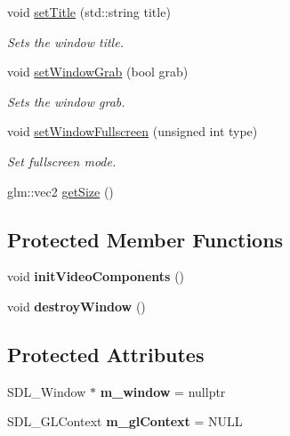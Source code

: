 \begin{DoxyCompactItemize}
void \hyperlink{classce_1_1core_1_1_window_ac182b4657e4240663b49923e6349e48c}{set\+Title} (std\+::string title)
\begin{DoxyCompactList}\small\item\em Sets the window title. \end{DoxyCompactList}\item 
void \hyperlink{classce_1_1core_1_1_window_a40a91b63d87c6942dea3186fb4b05085}{set\+Window\+Grab} (bool grab)
\begin{DoxyCompactList}\small\item\em Sets the window grab. \end{DoxyCompactList}\item 
void \hyperlink{classce_1_1core_1_1_window_a9fafce9f3898b399c149a561d9ceac12}{set\+Window\+Fullscreen} (unsigned int type)
\begin{DoxyCompactList}\small\item\em Set fullscreen mode. \end{DoxyCompactList}\item 
glm\+::vec2 \hyperlink{classce_1_1core_1_1_window_abba818ed742e942c7d009c1c1fd7ecca}{get\+Size} ()
\end{DoxyCompactItemize}
\subsection*{Protected Member Functions}
\begin{DoxyCompactItemize}
\item 
\mbox{\label{classce_1_1core_1_1_window_a03535243d5663e6f7432f2cba0888642}} 
void {\bfseries init\+Video\+Components} ()
\item 
\mbox{\label{classce_1_1core_1_1_window_aa29eebc80fdc4556365bc4c42e953a12}} 
void {\bfseries destroy\+Window} ()
\end{DoxyCompactItemize}
\subsection*{Protected Attributes}
\begin{DoxyCompactItemize}
\item 
\mbox{\label{classce_1_1core_1_1_window_a84ff05cd18af48c99b59f661544f0a5c}} 
S\+D\+L\+\_\+\+Window $\ast$ {\bfseries m\+\_\+window} = nullptr
\item 
\mbox{\label{classce_1_1core_1_1_window_ac218ede314fa261711eba26dbaabd4a7}} 
S\+D\+L\+\_\+\+G\+L\+Context {\bfseries m\+\_\+gl\+Context} = N\+U\+LL
\end{DoxyCompactItemize}


